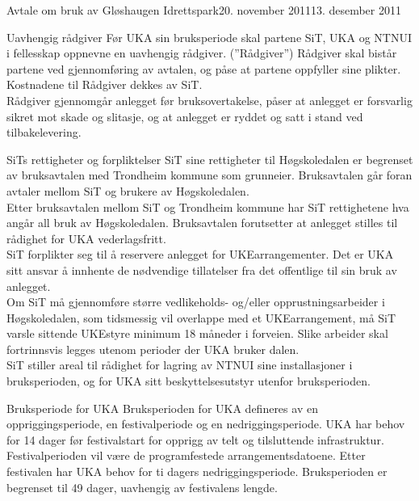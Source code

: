 \begin{instruks}{Avtale om bruk av Gløshaugen Idrettspark}{20. november 2011}{13. desember 2011}
\begin{instruksledd}{Uavhengig rådgiver}
Før UKA sin bruksperiode skal partene SiT, UKA og NTNUI i fellesskap oppnevne en uavhengig rådgiver. (”Rådgiver”)  Rådgiver skal bistår partene ved gjennomføring av avtalen, og påse at partene oppfyller sine plikter. Kostnadene til Rådgiver dekkes av SiT.\\  

Rådgiver gjennomgår anlegget før bruksovertakelse, påser at anlegget er forsvarlig sikret mot skade og slitasje, og at anlegget er ryddet og satt i stand ved tilbakelevering.\\
\end{instruksledd}
 
\begin{instruksledd}{SiTs rettigheter og forpliktelser}
SiT sine rettigheter til Høgskoledalen er begrenset av bruksavtalen med Trondheim kommune som grunneier. Bruksavtalen går foran avtaler mellom SiT og brukere av Høgskoledalen.\\

Etter bruksavtalen mellom SiT og Trondheim kommune har SiT rettighetene hva angår all bruk av Høgskoledalen. Bruksavtalen forutsetter at anlegget stilles til rådighet for UKA vederlagsfritt.\\

SiT forplikter seg til å reservere anlegget for UKEarrangementer. Det er UKA sitt ansvar å innhente de nødvendige tillatelser fra det offentlige til sin bruk av anlegget.\\

Om SiT må gjennomføre større vedlikeholds- og/eller opprustningsarbeider i Høgskoledalen, som tidsmessig vil overlappe med et UKEarrangement, må SiT varsle sittende UKEstyre minimum 18 måneder i forveien. Slike arbeider skal fortrinnsvis legges utenom perioder der UKA bruker dalen.\\

SiT stiller areal til rådighet for lagring av NTNUI sine installasjoner i bruksperioden, og for UKA sitt beskyttelsesutstyr utenfor bruksperioden.\\
\end{instruksledd}

\begin{instruksledd}{Bruksperiode for UKA}
Bruksperioden for UKA defineres av en oppriggingsperiode, en festivalperiode og en nedriggingsperiode. UKA har behov for 14 dager før festivalstart for opprigg av telt og tilsluttende infrastruktur. Festivalperioden vil være de programfestede arrangementsdatoene. Etter festivalen har UKA behov for ti dagers nedriggingsperiode.  Bruksperioden er begrenset til 49 dager, uavhengig av festivalens lengde.\\


\end{instruksledd}
\end{instruks}
